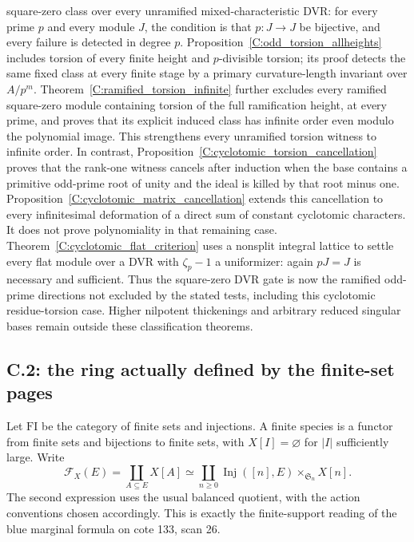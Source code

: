 \begin{remark}
square-zero class over every unramified mixed-characteristic DVR:
for every prime $p$ and every module $J$, the condition is that
$p:J\to J$ be bijective, and every failure is detected in degree
$p$. Proposition~\ref{C:odd_torsion_allheights} includes torsion
of every finite height and $p$-divisible torsion; its proof detects
the same fixed class at every finite stage by a primary
curvature-length invariant over $A/p^m$.
Theorem~\ref{C:ramified_torsion_infinite} further excludes every
ramified square-zero module containing torsion of the full
ramification height, at every prime, and proves that its explicit
induced class has infinite order even modulo the polynomial image.
This strengthens every unramified torsion witness to infinite order.
In contrast, Proposition~\ref{C:cyclotomic_torsion_cancellation}
proves that the rank-one witness cancels after induction when the
base contains a primitive odd-prime root of unity and the ideal
is killed by that root minus one. Proposition~\ref{C:cyclotomic_matrix_cancellation}
extends this cancellation to every infinitesimal deformation of a
direct sum of constant cyclotomic characters. It does not prove polynomiality
in that remaining case. Theorem~\ref{C:cyclotomic_flat_criterion}
uses a nonsplit integral lattice to settle every flat module over a
DVR with $\zeta_p-1$ a uniformizer: again $pJ=J$ is necessary
and sufficient. Thus the square-zero DVR gate is now the
ramified odd-prime directions not excluded by the stated tests,
including this cyclotomic residue-torsion case. Higher nilpotent
thickenings and arbitrary reduced singular bases remain outside
these classification theorems.
\end{remark}

\subsection{C.2: the ring actually defined by the finite-set pages}

Let $\mathrm{FI}$ be the category of finite sets and injections. A finite
species is a functor from finite sets and bijections to finite sets, with
$X[I]=\varnothing$ for $|I|$ sufficiently large. Write
\[
 \mathcal F_X(E)=\coprod_{A\subseteq E}X[A]
 \simeq\coprod_{n\geq0}\operatorname{Inj}([n],E)
                 \mathbin{\times}_{\mathfrak S_n}X[n].
\]
The second expression uses the usual balanced quotient, with the action
conventions chosen accordingly. This is exactly the finite-support reading
of the blue marginal formula on cote 133, scan 26.

